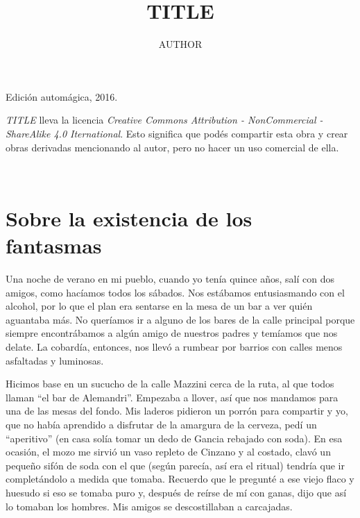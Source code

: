 \documentclass[11pt,twoside,openright]{book}
\title{TITLE}
\author{AUTHOR}
\date{}
\begin{document}
\pagestyle{plain}


%
%

\maketitle

\cleardoublepage

\thispagestyle{empty}
\noindent
Edición automágica, 2016.\\

\vspace{0.5cm}

\noindent
\emph{TITLE} lleva la licencia
\emph{Creative Commons Attribution - NonCommercial - ShareAlike 4.0 Iternational}.
Esto significa que podés compartir esta obra y crear obras derivadas
mencionando al autor, pero no ha\-cer un uso comercial de ella.

\vfill

\noindent
\\

\cleardoublepage


\renewcommand*\contentsname{Índice}

\tableofcontents





\chapter*{Sobre la existencia de los fantasmas} 





Una noche de verano en mi pueblo, cuando yo tenía quince años, salí con dos amigos, como hacíamos todos los sábados. Nos estábamos entusiasmando con el alcohol, por lo que el plan era sentarse en la mesa de un bar a ver quién aguantaba más. No queríamos ir a alguno de los bares de la calle principal porque siempre encontrábamos a algún amigo de nuestros padres y temíamos que nos delate. La cobardía, entonces, nos llevó a rumbear por barrios con calles menos asfaltadas y luminosas.

Hicimos base en un sucucho de la calle Mazzini cerca de la ruta, al que todos llaman “el bar de Alemandri”. Empezaba a llover, así que nos mandamos para una de las mesas del fondo. Mis laderos pidieron un porrón para compartir y yo, que no había aprendido a disfrutar de la amargura de la cerveza, pedí un “aperitivo” (en casa solía tomar un dedo de Gancia rebajado con soda). En esa ocasión, el mozo me sirvió un vaso repleto de Cinzano y al costado, clavó un pequeño sifón de soda con el que (según parecía, así era el ritual) tendría que ir completándolo a medida que tomaba. Recuerdo que le pregunté a ese viejo flaco y huesudo si eso se tomaba puro y, después de reírse de mí con ganas, dijo que así lo tomaban los hombres. Mis amigos se descostillaban a carcajadas.
\end{document}
